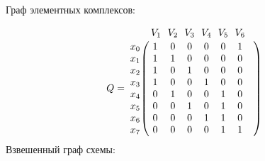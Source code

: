 \documentclass{article}
\begin{document}
Граф элементных комплексов:
\begin{figure}[h]
\end{figure}
$$
Q =
\bordermatrix{ & V_{1} \!&\! V_{2} \!&\! V_{3} \!&\! V_{4} \!&\! V_{5} \!&\! V_{6} \!&\! \cr 
x_{0} \!&\! 1 \!&\! 0 \!&\! 0 \!&\! 0 \!&\! 0 \!&\! 1 \!&\! \cr
x_{1} \!&\! 1 \!&\! 1 \!&\! 0 \!&\! 0 \!&\! 0 \!&\! 0 \!&\! \cr
x_{2} \!&\! 1 \!&\! 0 \!&\! 1 \!&\! 0 \!&\! 0 \!&\! 0 \!&\! \cr
x_{3} \!&\! 1 \!&\! 0 \!&\! 0 \!&\! 1 \!&\! 0 \!&\! 0 \!&\! \cr
x_{4} \!&\! 0 \!&\! 1 \!&\! 0 \!&\! 0 \!&\! 1 \!&\! 0 \!&\! \cr
x_{5} \!&\! 0 \!&\! 0 \!&\! 1 \!&\! 0 \!&\! 1 \!&\! 0 \!&\! \cr
x_{6} \!&\! 0 \!&\! 0 \!&\! 0 \!&\! 1 \!&\! 1 \!&\! 0 \!&\! \cr
x_{7} \!&\! 0 \!&\! 0 \!&\! 0 \!&\! 0 \!&\! 1 \!&\! 1 \!&\! \cr
}$$
Взвешенный граф схемы:
\end{document}
